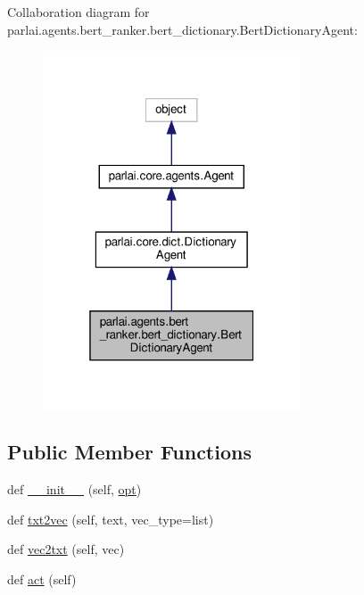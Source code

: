 Collaboration diagram for parlai.\+agents.\+bert\+\_\+ranker.\+bert\+\_\+dictionary.\+Bert\+Dictionary\+Agent\+:
\nopagebreak
\begin{figure}[H]
\begin{center}
\leavevmode
\includegraphics[width=217pt]{dc/da1/classparlai_1_1agents_1_1bert__ranker_1_1bert__dictionary_1_1BertDictionaryAgent__coll__graph}
\end{center}
\end{figure}
\subsection*{Public Member Functions}
\begin{DoxyCompactItemize}
\item 
def \hyperlink{classparlai_1_1agents_1_1bert__ranker_1_1bert__dictionary_1_1BertDictionaryAgent_aedf3441c187fc809926e490a9cab9875}{\+\_\+\+\_\+init\+\_\+\+\_\+} (self, \hyperlink{classparlai_1_1core_1_1dict_1_1DictionaryAgent_a6c0d7c9c31b38e99b747be88395d689f}{opt})
\item 
def \hyperlink{classparlai_1_1agents_1_1bert__ranker_1_1bert__dictionary_1_1BertDictionaryAgent_a407dcd1aa927f8065334a825b2d099d9}{txt2vec} (self, text, vec\+\_\+type=list)
\item 
def \hyperlink{classparlai_1_1agents_1_1bert__ranker_1_1bert__dictionary_1_1BertDictionaryAgent_a6269b15dc01bfaac5dd1b5da995f2f0f}{vec2txt} (self, vec)
\item 
def \hyperlink{classparlai_1_1agents_1_1bert__ranker_1_1bert__dictionary_1_1BertDictionaryAgent_a35cefbd011319119e4a395afd6618ac6}{act} (self)
\end{DoxyCompactItemize}
